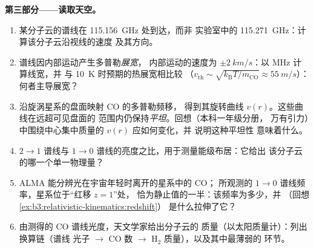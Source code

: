 \begin{problem}
\medskip\noindent\textbf{第三部分——读取天空。}
\begin{enumerate}[resume]
  \item 某分子云的谱线在 \qty{115.156}{GHz} 处到达，而非
        实验室中的 \qty{115.271}{GHz}：计算该分子云沿视线的速度
        及其方向。
  \item 谱线因内部运动产生多普勒\emph{展宽}，
        内部运动的速度为 $\pm\qty{2}{km/s}$：以 MHz 计算线宽，并
        与 \qty{10}{K} 时预期的热展宽相比较
        （$v_{\text{th}} \sim \sqrt{k_{\text{B}}T/m_{\text{CO}}}
        \approx \qty{55}{m/s}$）：何者主导展宽？
  \item 沿旋涡星系的盘面映射 CO 的多普勒频移，
        得到其旋转曲线 $v(r)$。这些曲线在远超可见盘面的
        范围内仍保持\emph{平坦}。回想（本科一年级分册，
        万有引力）中围绕中心集中质量的 $v(r)$ 应如何变化，并
        说明这种平坦性
        意味着什么。
  \item $2\to1$ 谱线与
        $1\to0$ 谱线的亮度之比，用于测量能级布居：它给出
        该分子云的哪一个单一物理量？
  \item ALMA 能分辨光在宇宙年轻时离开的星系中的 CO；
        所观测的
        $1 \to 0$ 谱线频率，星系位于“红移 $z = 1$”处，
        恰为静止值的一半：该频率为多少，并
        （回想\cref{ex:b3:relativistic-kinematics:redshift}）
        是什么拉伸了它？
  \item 由测得的 CO 谱线光度，天文学家给出分子云的
        质量（以太阳质量计）：列出换算链（谱线
        光子 $\to$ CO 数 $\to$ H$_2$ 质量），以及其中最薄弱的
        环节。
\end{enumerate}


\end{problem}
